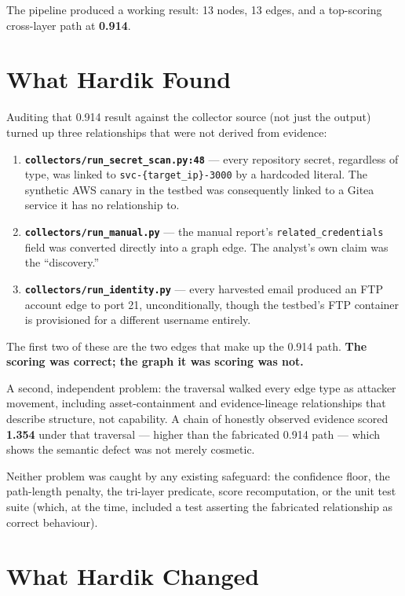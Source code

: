 \documentclass[11pt,a4paper]{article}
\begin{document}
The pipeline produced a working result: 13 nodes, 13 edges, and a top-scoring cross-layer path at \textbf{0.914}.

\section{What Hardik Found}

Auditing that 0.914 result against the collector source (not just the output) turned up three relationships that were not derived from evidence:

\begin{enumerate}[leftmargin=*]
\item \textbf{\texttt{collectors/run\_secret\_scan.py:48}} --- every repository secret, regardless of type, was linked to \texttt{svc-\{target\_ip\}-3000} by a hardcoded literal. The synthetic AWS canary in the testbed was consequently linked to a Gitea service it has no relationship to.
\item \textbf{\texttt{collectors/run\_manual.py}} --- the manual report's \texttt{related\_credentials} field was converted directly into a graph edge. The analyst's own claim was the ``discovery.''
\item \textbf{\texttt{collectors/run\_identity.py}} --- every harvested email produced an FTP account edge to port 21, unconditionally, though the testbed's FTP container is provisioned for a different username entirely.
\end{enumerate}

The first two of these are the two edges that make up the 0.914 path. \textbf{The scoring was correct; the graph it was scoring was not.}

A second, independent problem: the traversal walked every edge type as attacker movement, including asset-containment and evidence-lineage relationships that describe structure, not capability. A chain of honestly observed evidence scored \textbf{1.354} under that traversal --- higher than the fabricated 0.914 path --- which shows the semantic defect was not merely cosmetic.

Neither problem was caught by any existing safeguard: the confidence floor, the path-length penalty, the tri-layer predicate, score recomputation, or the unit test suite (which, at the time, included a test asserting the fabricated relationship as correct behaviour).

\section{What Hardik Changed}
\end{document}
